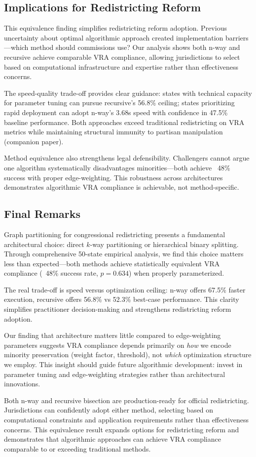 \subsection{Implications for Redistricting Reform}

This equivalence finding simplifies redistricting reform adoption. Previous uncertainty about optimal algorithmic approach created implementation barriers—which method should commissions use? Our analysis shows both n-way and recursive achieve comparable VRA compliance, allowing jurisdictions to select based on computational infrastructure and expertise rather than effectiveness concerns.

The speed-quality trade-off provides clear guidance: states with technical capacity for parameter tuning can pursue recursive's 56.8\% ceiling; states prioritizing rapid deployment can adopt n-way's 3.68s speed with confidence in 47.5\% baseline performance. Both approaches exceed traditional redistricting on VRA metrics while maintaining structural immunity to partisan manipulation (companion paper).

Method equivalence also strengthens legal defensibility. Challengers cannot argue one algorithm systematically disadvantages minorities—both achieve ~48\% success with proper edge-weighting. This robustness across architectures demonstrates algorithmic VRA compliance is achievable, not method-specific.

\subsection{Final Remarks}

Graph partitioning for congressional redistricting presents a fundamental architectural choice: direct $k$-way partitioning or hierarchical binary splitting. Through comprehensive 50-state empirical analysis, we find this choice matters less than expected—both methods achieve statistically equivalent VRA compliance (~48\% success rate, $p=0.634$) when properly parameterized.

The real trade-off is speed versus optimization ceiling: n-way offers 67.5\% faster execution, recursive offers 56.8\% vs 52.3\% best-case performance. This clarity simplifies practitioner decision-making and strengthens redistricting reform adoption.

Our finding that architecture matters little compared to edge-weighting parameters suggests VRA compliance depends primarily on \textit{how} we encode minority preservation (weight factor, threshold), not \textit{which} optimization structure we employ. This insight should guide future algorithmic development: invest in parameter tuning and edge-weighting strategies rather than architectural innovations.

Both n-way and recursive bisection are production-ready for official redistricting. Jurisdictions can confidently adopt either method, selecting based on computational constraints and application requirements rather than effectiveness concerns. This equivalence result expands options for redistricting reform and demonstrates that algorithmic approaches can achieve VRA compliance comparable to or exceeding traditional methods.
